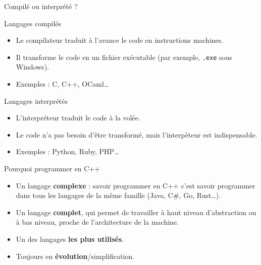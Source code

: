 \begin{frame}{Compilé ou interprété ?}
	\begin{block}{Langages compilés}
		\begin{itemize}
		\item Le compilateur traduit à l'avance le code en instructions machines.
		\item Il transforme le code en un fichier exécutable (par exemple, \texttt{.exe} sous Windows).
		\item Exemples : C, C++, OCaml\dots
		\end{itemize}
	\end{block}
	\begin{block}{Langages interprétés}
		\begin{itemize}
		\item L'interpréteur traduit le code à la volée.
		\item Le code n'a pas besoin d'être transformé, mais l'interpèteur est indispensable.
		\item Exemples : Python, Ruby, PHP\dots
		\end{itemize}
	\end{block}
\end{frame}

\begin{frame}{Pourquoi programmer en C++}
    \begin{itemize}
        \item Un langage \textbf{complexe} : savoir programmer en C++ c'est savoir programmer dans tous les langages de la même famille (Java, C\#, Go, Rust\dots).
        \item Un langage \textbf{complet}, qui permet de travailler à haut niveau d'abstraction ou à bas niveau, proche de l'architecture de la machine.
        \item Un des langages \textbf{les plus utilisés}.
        \item Toujours en \textbf{évolution}/simplification.
    \end{itemize}
\end{frame}

